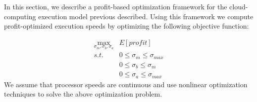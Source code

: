 \noindent 

In this section, we describe a profit-based optimization framework for
the cloud-computing execution model previous described. Using this
framework we compute profit-optimized execution speeds by
optimizing the following objective function:







\begin{equation}
\label{optimization_problem}
\begin{alignedat}{2}
\max_{\sigma_m,\sigma_b,\sigma_a}     & E[profit] \\
s.t.                                 & 0 \leq \sigma_m \leq \sigma_{max} \\
                                     & 0 \leq \sigma_b \leq \sigma_{m} \\
                                     & 0 \leq \sigma_a \leq \sigma_{max} 
\end{alignedat}
\end{equation}
We assume that processor
speeds are continuous and use nonlinear optimization techniques
to solve the above optimization problem. 

